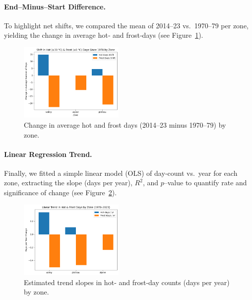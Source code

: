 \paragraph{End–Minus–Start Difference.}
To highlight net shifts, we compared the mean of 2014–23 vs.\ 1970–79 per zone, yielding the change in average hot‐ and frost‐days (see Figure~\ref{fig:decade_difference}).
\begin{figure}[ht]
  \centering
    \includegraphics[width=0.45\textwidth]{img/end-minus-start_diff.png}
  \caption{Change in average hot and frost days (2014–23 minus 1970–79) by zone.}
  \label{fig:decade_difference}
\end{figure}

\paragraph{Linear Regression Trend.}
Finally, we fitted a simple linear model (OLS) of day‐count vs.\ year for each zone, extracting the slope (days per year), $R^2$, and $p$–value to quantify rate and significance of change (see Figure~\ref{fig:linear_trend}).
\begin{figure}[ht]
  \centering
    \includegraphics[width=0.45\textwidth]{img/linear_reg_trend.png}
  \caption{Estimated trend slopes in hot‐ and frost‐day counts (days per year) by zone.}
  \label{fig:linear_trend}
\end{figure}



